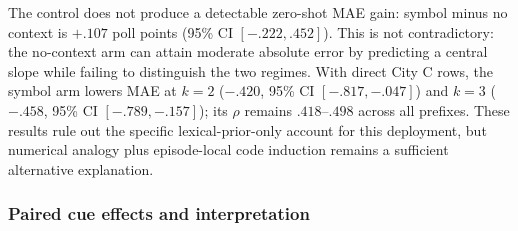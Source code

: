 The control does not produce a detectable zero-shot MAE gain: symbol minus no
context is $+.107$ poll points (95\% CI $[-.222,.452]$). This is not contradictory:
the no-context arm can attain moderate absolute error by predicting a central slope
while failing to distinguish the two regimes. With direct City C rows, the symbol
arm lowers MAE at $k=2$ ($-.420$, 95\% CI $[-.817,-.047]$) and $k=3$ ($-.458$,
95\% CI $[-.789,-.157]$); its $\rho$ remains $.418$--$.498$ across all prefixes.
These results rule out the specific lexical-prior-only account for this deployment,
but numerical analogy plus episode-local code induction remains a sufficient
alternative explanation.

\subsubsection{Paired cue effects and interpretation}

